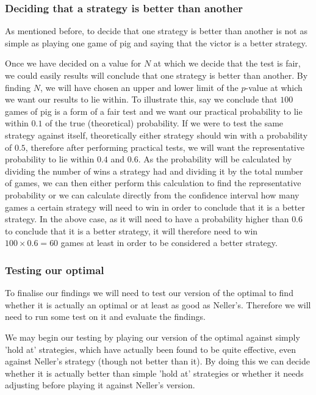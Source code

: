 \documentclass[a4paper,titlepage]{article}
\begin{document}
 \subsubsection{Deciding that a strategy is better than another}
As mentioned before, to decide that one strategy is better than another is not as simple as playing one game of pig and saying that the victor is a better strategy.

Once we have decided on a value for $N$ at which we decide that the test is fair, we could easily results will conclude that one strategy is better than another. By finding $N$, we will have chosen an upper and lower limit of the $p$-value at which we want our results to lie within. To illustrate this, say we conclude that $100$ games of pig is a form of a fair test and we want our practical probability to lie within $0.1$ of the true (theoretical) probability. If we were to test the same strategy against itself, theoretically either strategy should win with a probability of $0.5$, therefore after performing practical tests, we will want the representative probability to lie within $0.4$ and $0.6$. As the probability will be calculated by dividing the number of wins a strategy had and dividing it by the total number of games, we can then either perform this calculation to find the representative probability or we can calculate directly from the confidence interval how many games a certain strategy will need to win in order to conclude that it is a better strategy. In the above case, as it will need to have a probability higher than $0.6$ to conclude that it is a better strategy, it will therefore need to win $100\times0.6=60$ games at least in order to be considered a better strategy.
\subsubsection{Testing our optimal}
To finalise our findings we will need to test our version of the optimal to find whether it is actually an optimal or at least as good as Neller’s\citep{neller2004optimal}. Therefore we will need to run some test on it and evaluate the findings.

We may begin our testing by playing our version of the optimal against simply 'hold at' strategies, which have actually been found to be quite effective, even against Neller’s strategy (though not better than it). By doing this we can decide whether it is actually better than simple 'hold at' strategies or whether it needs adjusting before playing it against Neller’s version.
\end{document}
